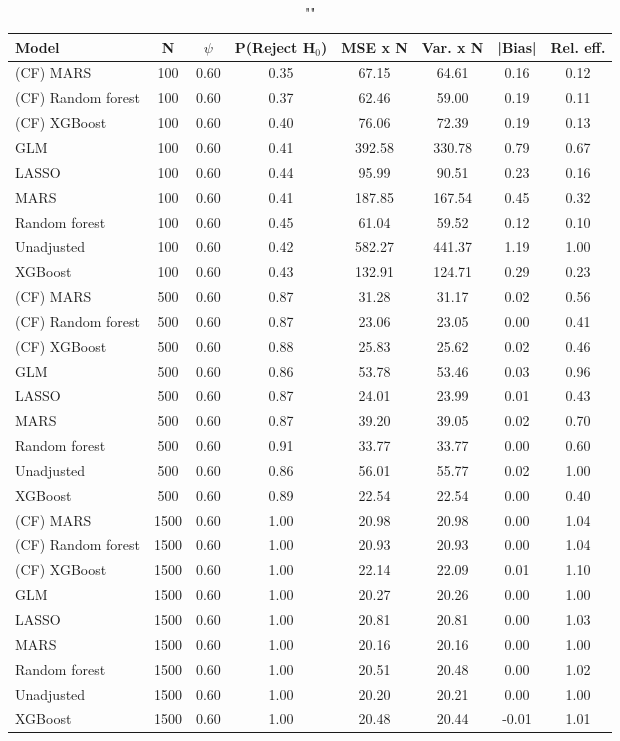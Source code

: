 \begin{table}
\centering
\caption{""}
\begin{tabular}{lccccccc}
\toprule
Model & N & $\psi$ & P(Reject H$_0$) & MSE x N & Var. x N & |Bias| & Rel. eff.\\ \midrule
(CF) MARS & 100 & 0.60 & 0.35 &  67.15 &  64.61 &  0.16 & 0.12 \\ 
(CF) Random forest & 100 & 0.60 & 0.37 &  62.46 &  59.00 &  0.19 & 0.11 \\ 
(CF) XGBoost & 100 & 0.60 & 0.40 &  76.06 &  72.39 &  0.19 & 0.13 \\ 
GLM & 100 & 0.60 & 0.41 & 392.58 & 330.78 &  0.79 & 0.67 \\ 
LASSO & 100 & 0.60 & 0.44 &  95.99 &  90.51 &  0.23 & 0.16 \\ 
MARS & 100 & 0.60 & 0.41 & 187.85 & 167.54 &  0.45 & 0.32 \\ 
Random forest & 100 & 0.60 & 0.45 &  61.04 &  59.52 &  0.12 & 0.10 \\ 
Unadjusted & 100 & 0.60 & 0.42 & 582.27 & 441.37 &  1.19 & 1.00 \\ 
XGBoost & 100 & 0.60 & 0.43 & 132.91 & 124.71 &  0.29 & 0.23 \\ \addlinespace 
(CF) MARS & 500 & 0.60 & 0.87 &  31.28 &  31.17 &  0.02 & 0.56 \\ 
(CF) Random forest & 500 & 0.60 & 0.87 &  23.06 &  23.05 &  0.00 & 0.41 \\ 
(CF) XGBoost & 500 & 0.60 & 0.88 &  25.83 &  25.62 &  0.02 & 0.46 \\ 
GLM & 500 & 0.60 & 0.86 &  53.78 &  53.46 &  0.03 & 0.96 \\ 
LASSO & 500 & 0.60 & 0.87 &  24.01 &  23.99 &  0.01 & 0.43 \\ 
MARS & 500 & 0.60 & 0.87 &  39.20 &  39.05 &  0.02 & 0.70 \\ 
Random forest & 500 & 0.60 & 0.91 &  33.77 &  33.77 &  0.00 & 0.60 \\ 
Unadjusted & 500 & 0.60 & 0.86 &  56.01 &  55.77 &  0.02 & 1.00 \\ 
XGBoost & 500 & 0.60 & 0.89 &  22.54 &  22.54 &  0.00 & 0.40 \\ \addlinespace 
(CF) MARS & 1500 & 0.60 & 1.00 &  20.98 &  20.98 &  0.00 & 1.04 \\ 
(CF) Random forest & 1500 & 0.60 & 1.00 &  20.93 &  20.93 &  0.00 & 1.04 \\ 
(CF) XGBoost & 1500 & 0.60 & 1.00 &  22.14 &  22.09 &  0.01 & 1.10 \\ 
GLM & 1500 & 0.60 & 1.00 &  20.27 &  20.26 &  0.00 & 1.00 \\ 
LASSO & 1500 & 0.60 & 1.00 &  20.81 &  20.81 &  0.00 & 1.03 \\ 
MARS & 1500 & 0.60 & 1.00 &  20.16 &  20.16 &  0.00 & 1.00 \\ 
Random forest & 1500 & 0.60 & 1.00 &  20.51 &  20.48 &  0.00 & 1.02 \\ 
Unadjusted & 1500 & 0.60 & 1.00 &  20.20 &  20.21 &  0.00 & 1.00 \\ 
XGBoost & 1500 & 0.60 & 1.00 &  20.48 &  20.44 & -0.01 & 1.01 \\
\bottomrule
\end{tabular}
\end{table}

